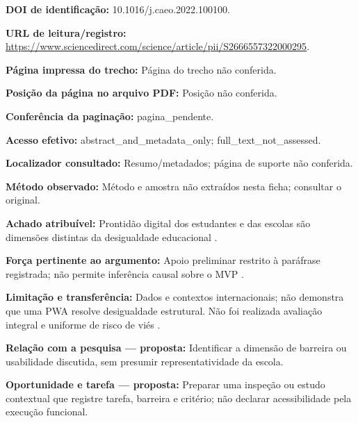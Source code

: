 \noindent\textbf{DOI de identificação:} 10.1016/j.caeo.2022.100100.\par\medskip

\noindent\textbf{URL de leitura/registro:} \url{https://www.sciencedirect.com/science/article/pii/S2666557322000295}.\par\medskip

\noindent\textbf{Página impressa do trecho:} Página do trecho não conferida.\par\medskip

\noindent\textbf{Posição da página no arquivo PDF:} Posição não conferida.\par\medskip

\noindent\textbf{Conferência da paginação:} pagina\_pendente.\par\medskip

\noindent\textbf{Acesso efetivo:} abstract\_and\_metadata\_only; full\_text\_not\_assessed.\par\medskip

\noindent\textbf{Localizador consultado:} Resumo/metadados; página de suporte não conferida.\par\medskip

\noindent\textbf{Método observado:} Método e amostra não extraídos nesta ficha; consultar o original.\par\medskip

\noindent\textbf{Achado atribuível:} Prontidão digital dos estudantes e das escolas são dimensões distintas da desigualdade educacional \citep{werfhorst2022}.\par\medskip

\noindent\textbf{Força pertinente ao argumento:} Apoio preliminar restrito à paráfrase registrada; não permite inferência causal sobre o MVP \citep{werfhorst2022}.\par\medskip

\noindent\textbf{Limitação e transferência:} Dados e contextos internacionais; não demonstra que uma PWA resolve desigualdade estrutural. Não foi realizada avaliação integral e uniforme de risco de viés \citep{werfhorst2022}.\par\medskip

\noindent\textbf{Relação com a pesquisa — proposta:} Identificar a dimensão de barreira ou usabilidade discutida, sem presumir representatividade da escola.\par\medskip

\noindent\textbf{Oportunidade e tarefa — proposta:} Preparar uma inspeção ou estudo contextual que registre tarefa, barreira e critério; não declarar acessibilidade pela execução funcional.\par\medskip

